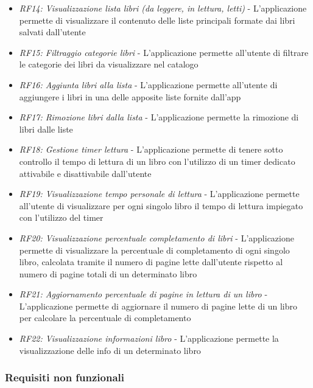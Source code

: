 \documentclass{article}
\begin{document}
\begin{itemize}
\begin{itemize}
        \item \textit{RF14: Visualizzazione lista libri (da leggere, in lettura, letti)} - L'applicazione permette di visualizzare il contenuto delle liste principali formate dai libri salvati dall'utente
        \item \textit{RF15: Filtraggio categorie libri} - L'applicazione permette all'utente di filtrare le categorie dei libri da visualizzare nel catalogo 
        \item \textit{RF16: Aggiunta libri alla lista} - L'applicazione permette all'utente di aggiungere i libri in una delle apposite liste fornite dall'app
        \item \textit{RF17: Rimozione libri dalla lista} - L'applicazione permette la rimozione di libri dalle liste
        \item \textit{RF18: Gestione timer lettura} - L'applicazione permette di tenere sotto controllo il tempo di lettura di un libro con l'utilizzo di un timer dedicato attivabile e disattivabile dall'utente
        \item \textit{RF19: Visualizzazione tempo personale di lettura} - L'applicazione permette all'utente di visualizzare per ogni singolo libro il tempo di lettura impiegato con l'utilizzo del timer
        \item \textit{RF20: Visualizzazione percentuale completamento di libri} - L'applicazione permette di visualizzare la percentuale di completamento di ogni singolo libro, calcolata tramite il numero di pagine lette dall'utente rispetto al numero di pagine totali di un determinato libro
        \item \textit{RF21: Aggiornamento percentuale di pagine in lettura di un libro} - L'applicazione permette di aggiornare il numero di pagine lette di un libro per calcolare la percentuale di completamento
        \item \textit{RF22: Visualizzazione informazioni libro} - L'applicazione permette la visualizzazione delle info di un determinato libro 
    \end{itemize}
\end{itemize}

\subsubsection{Requisiti non funzionali}
\end{document}
